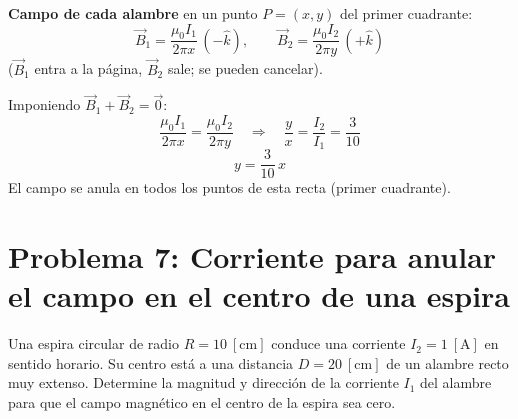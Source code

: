 \documentclass[12pt,letterpaper]{article}
\begin{document}
\noindent
\begin{minipage}[t]{0.42\textwidth}
\centering
\vspace{0pt}
\end{minipage}%
\hfill
\begin{minipage}[t]{0.55\textwidth}
\vspace{0pt}
\textbf{Campo de cada alambre} en un punto $P=(x,y)$ del primer cuadrante:
\[
    \vec{B}_1 = \frac{\mu_0 I_1}{2\pi x}\,(-\hat{k}),
    \qquad
    \vec{B}_2 = \frac{\mu_0 I_2}{2\pi y}\,(+\hat{k})
\]
($\vec{B}_1$ entra a la p\'agina, $\vec{B}_2$ sale; se pueden cancelar).
\end{minipage}

\medskip

\noindent Imponiendo $\vec{B}_1 + \vec{B}_2 = \vec{0}$:
\[
    \frac{\mu_0 I_1}{2\pi x} = \frac{\mu_0 I_2}{2\pi y}
    \quad\Longrightarrow\quad
    \frac{y}{x} = \frac{I_2}{I_1} = \frac{3}{10}
\]
\[
    \boxed{y = \frac{3}{10}\,x}
\]
El campo se anula en todos los puntos de esta recta (primer cuadrante).

\vspace{0.8cm}

\section*{Problema 7: Corriente para anular el campo en el centro de una espira}

\noindent Una espira circular de radio $R = 10\ [\text{cm}]$ conduce una corriente
$I_2 = 1\ [\text{A}]$ en sentido horario. Su centro est\'a a una distancia $D = 20\ [\text{cm}]$
de un alambre recto muy extenso. Determine la magnitud y direcci\'on de la corriente $I_1$ del
alambre para que el campo magn\'etico en el centro de la espira sea cero.
\end{document}
